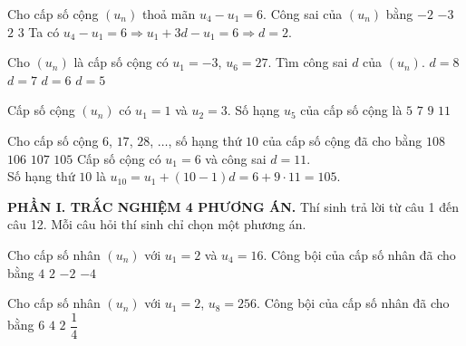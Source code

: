 \begin{ex}%
	Cho cấp số cộng $\left(u_n \right)$ thoả mãn $u_4 - u_1 = 6$. Công sai của $\left(u_n \right)$ bằng
	\choice
	{$-2$}
	{$-3$}
	{\True $2$}
	{$3$}
	\loigiai
	{
	Ta có $u_4 - u_1 = 6 \Rightarrow u_1 + 3d - u_1 = 6 \Rightarrow d = 2$.
	}
\end{ex}

\begin{ex}%
	Cho $\left(u_n\right)$ là cấp số cộng có $u_1=-3$, $u_6=27$. Tìm công sai $d$ của $\left(u_n\right)$.
	\choice
	{$d=8$}
	{$d=7$}
	{\True $d=6$}
	{$d=5$}
\end{ex}

%

\begin{ex}%
	Cấp số cộng $(u_n)$ có $u_1=1$ và $u_2=3$. Số hạng $u_5$ của cấp số cộng là
	\choice
	{$5$}
	{$7$}
	{\True $9$}
	{$11$}
\end{ex}

\begin{ex}%
	Cho cấp số cộng $6$, $17$, $28$, $\ldots$, số hạng thứ $10$ của cấp số cộng đã cho bằng
	\choice
	{$108$}
	{$106$}
	{$107$}
	{\True $105$}
	\loigiai
	{
	Cấp số cộng có $u_1=6$ và công sai $d=11$.\\
	Số hạng thứ $10$ là $u_{10}=u_1+(10-1)d=6+9\cdot 11=105$.
	}
\end{ex}

%

\noindent\textbf{PHẦN I. TRẮC NGHIỆM 4 PHƯƠNG ÁN.} Thí sinh trả lời từ câu 1 đến câu 12. Mỗi câu hỏi thí sinh chỉ chọn một phương án.
\setcounter{ex}{0}

\begin{ex}%
	Cho cấp số nhân $\left(u_n\right)$ với $u_1=2$ và $u_4=16$. Công bội của cấp số nhân đã cho bằng
	\choice
	{$4$}
	{\True $2$}
	{$-2$}
	{$-4$}
\end{ex}

\begin{ex}%
	Cho cấp số nhân $(u_n)$ với $u_1 = 2$, $u_8 = 256$. Công bội của cấp số nhân đã cho bằng
	\choice
	{$6$}
	{$4$}
	{\True $2$}
	{$\dfrac{1}{4}$}
\end{ex}


